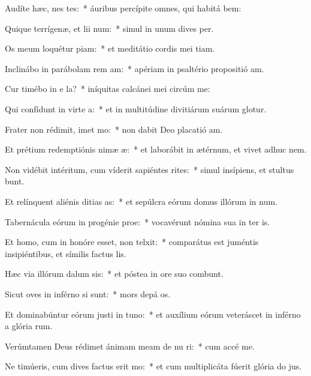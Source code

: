 \item Audíte hæc, nes tes:~* áuribus percípite omnes, qui habitá bem:
\item Quique terrígenæ, et lii num:~* simul in unum dives  per.
\item Os meum loquétur piam:~* et meditátio cordis mei tiam.
\item Inclinábo in parábolam rem am:~* apériam in psaltério propositió am.
\item Cur timébo in e la?~* iníquitas calcánei mei circúm me:
\item Qui confídunt in virte a:~* et in multitúdine divitiárum suárum glotur.
\item Frater non rédimit, imet mo:~* non dabit Deo placatió am.
\item Et prétium redemptiónis nimæ æ:~* et laborábit in ætérnum, et vivet adhuc  nem.
\item Non vidébit intéritum, cum víderit sapiéntes rites:~* simul insípiens, et stultus bunt.
\item Et relínquent aliénis ditias as:~* et sepúlcra eórum domus illórum in num.
\item Tabernácula eórum in progénie  proe:~* vocavérunt nómina sua in ter is.
\item Et homo, cum in honóre esset, non telxit:~* comparátus est juméntis insipiéntibus, et símilis factus  lis.
\item Hæc via illórum dalum sis:~* et póstea in ore suo combunt.
\item Sicut oves in inférno si sunt:~* mors depá os.
\item Et dominabúntur eórum justi in tuno:~* et auxílium eórum veteráscet in inférno a glória rum.
\item Verúmtamen Deus rédimet ánimam meam de nu ri:~* cum accé me.
\item Ne timúeris, cum dives factus erit mo:~* et cum multiplicáta fúerit glória do jus.
